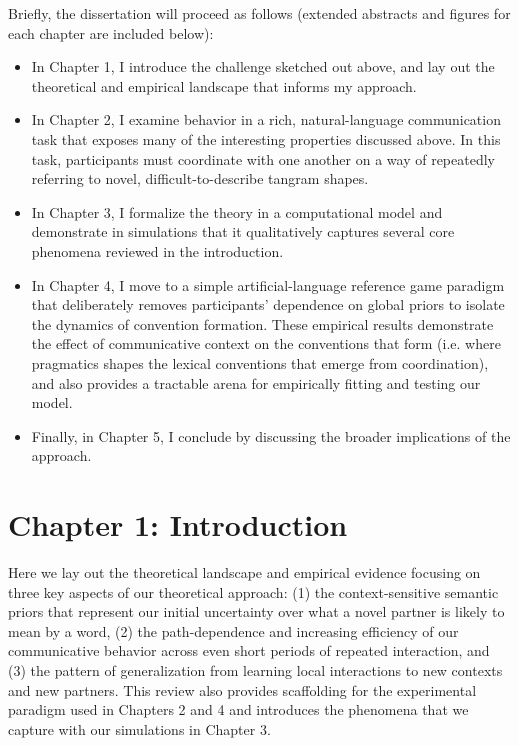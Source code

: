 \documentclass[12pt, donotrepeattitle, man, floatsintext]{apa6}
\begin{document}
Briefly, the dissertation will proceed as follows (extended abstracts and figures for each chapter are included below): 
\begin{itemize}
\item In Chapter 1, I introduce the challenge sketched out above, and lay out the theoretical and empirical landscape that informs my approach.
\item In Chapter 2, I examine behavior in a rich, natural-language communication task that exposes many of the interesting properties discussed above. In this task, participants must coordinate with one another on a way of repeatedly referring to novel, difficult-to-describe tangram shapes. 
\item In Chapter 3, I formalize the theory in a computational model and demonstrate in simulations that it qualitatively captures several core phenomena reviewed in the introduction. 
\item In Chapter 4, I move to a simple artificial-language reference game paradigm that deliberately removes participants' dependence on global priors to isolate the dynamics of convention formation. These empirical results demonstrate the effect of communicative context on the conventions that form (i.e. where pragmatics shapes the lexical conventions that emerge from coordination), and also provides a tractable arena for empirically fitting and testing our model.
\item Finally, in Chapter 5, I conclude by discussing the broader implications of the approach.
\end{itemize}

\section{Chapter 1: Introduction}

Here we lay out the theoretical landscape and empirical evidence focusing on three key aspects of our theoretical approach: (1) the context-sensitive semantic priors that represent our initial uncertainty over what a novel partner is likely to mean by a word, (2) the path-dependence and increasing efficiency of our communicative behavior across even short periods of repeated interaction, and (3) the pattern of generalization from learning local interactions to new contexts and new partners. This review also provides scaffolding for the experimental paradigm used in Chapters 2 and 4 and introduces the phenomena that we capture with our simulations in Chapter 3.
\end{document}
